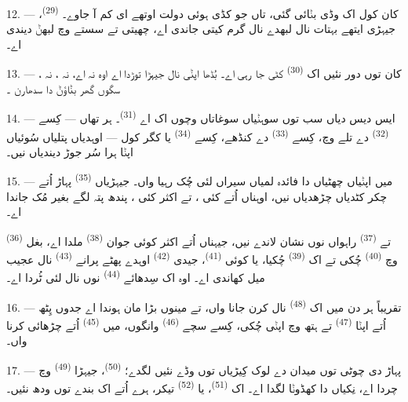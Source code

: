 12. --- کان کول اک وڈی  بݨائی گئی، تاں جو کڈی ہوئی دولت اوتھے
ای کم آ جاوے۔  \textsuperscript{(29)}، جیہڑی ایتھے بہتات نال لبھدے
 نال گرم کیتی جاندی اے، چھیتی تے سستے وچ  لبھݨ
دیندی اے۔

13. --- کان توں دور نئیں اک  \textsuperscript{(30)} کٹی جا رہی اے۔
بُڈھا  اپݨی  نال جیہڑا توڑدا اے اوہ نہ
 اے، نہ ، نہ ، سگوں گھر بݨاؤݨ دا
سدھارن ۔

14. --- ایس دیس دیاں سب توں سوہݨیاں سوغاتاں وچوں اک اے 
\textsuperscript{(31)}۔ ہر تھاں — کِسے  \textsuperscript{(32)} دے تلے وچ،
کِسے  \textsuperscript{(33)} دے کنڈھے، کِسے 
\textsuperscript{(34)} یا کگر کول — اوہدیاں پتلیاں سُوئیاں اپݨا ہرا سُر جوڑ
دیندیاں نیں۔

\VUsaut{3.0mm}
\VUsaut{3.0mm}

15. --- میں اپݨیاں چھٹیاں دا فائدہ لمیاں سیراں لئی چُک رہیا واں۔ جیہڑیاں
 \textsuperscript{(35)} پہاڑ اُتے چکر کٹدیاں چڑھدیاں نیں، اوہناں
اُتے کئی ، تے اکثر کئی ، پندھ پتہ لگے بغیر مُک جاندا
اے۔

 \textsuperscript{(36)} تے  \textsuperscript{(37)}
راہواں نوں نشان لاندے نیں، جیہناں اُتے اکثر کوئی جوان 
\textsuperscript{(38)} ملدا اے، بغل وچ  \textsuperscript{(40)} چُکی تے اک
 \textsuperscript{(39)} چُکیا، یا کوئی 
\textsuperscript{(41)}، جیدی  \textsuperscript{(42)} اوہدے
پھٹے پرانے  \textsuperscript{(43)} نال عجیب میل کھاندی اے۔ اوہ اک
سِدھائے  \textsuperscript{(44)} نوں  نال لئی ٹُردا اے۔

\VUsaut{3.0mm}

16. --- تقریباً ہر دن میں اک  \textsuperscript{(48)} نال
 کرن جانا واں، تے مینوں بڑا مان ہوندا اے جدوں پِٹھ اُتے اپݨا
 \textsuperscript{(47)} تے ہتھ وچ اپݨی  چُکی، کِسے سچے
 \textsuperscript{(46)} وانگوں، میں 
\textsuperscript{(45)} اُتے چڑھائی کرنا واں۔

17. --- پہاڑ دی چوٹی توں میدان دے لوک کِیڑیاں توں وڈے نئیں لگدے؛
 \textsuperscript{(50)}، جیہڑا 
\textsuperscript{(49)} وچ چردا اے، نِکیاں دا کھڈوݨا لگدا اے۔ اک 
\textsuperscript{(51)}، یا  \textsuperscript{(52)} تیکر، ہرے
اُتے اک بندے توں ودھ نئیں۔

